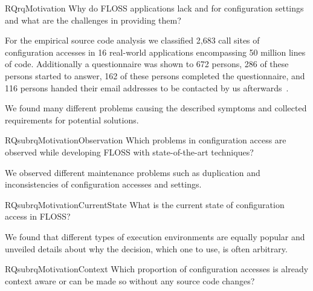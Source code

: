 \begin{restatable}{RQ}{rqMotivation}
Why do FLOSS applications lack  and  for configuration settings and what are the challenges in providing them?
 \label{rq:motivation}
\end{restatable}

For the empirical source code analysis we classified 2,683 call sites of configuration accesses in 16 real-world applications encompassing 50 million lines of code.
Additionally a questionnaire was shown to 672 persons, 286 of these persons started to answer, 162 of these persons completed the questionnaire, and 116 persons handed their email addresses to be contacted by us afterwards~\cite{raab2017challenges}.

\begin{contribution}
We found many different problems causing the described symptoms and collected requirements for potential solutions.
\end{contribution}

\begin{restatable}{RQsub}{rqMotivationObservation}
Which problems in configuration access are observed while developing FLOSS with state-of-the-art techniques?%
\label{rq:motivation-observation}
\end{restatable}

\begin{contribution}
We observed different maintenance problems such as duplication and inconsistencies of configuration accesses and settings.
\end{contribution}

\begin{restatable}{RQsub}{rqMotivationCurrentState}
What is the current state of configuration access in FLOSS?%
\label{rq:motivation-current-state}
\end{restatable}

\begin{contribution}
We found that different types of execution environments are equally popular and unveiled details about why the decision, which one to use, is often arbitrary.
\end{contribution}

\begin{restatable}{RQsub}{rqMotivationContext}
Which proportion of configuration accesses is already context aware or can be made so without any source code changes?%
\label{rq:motivation-context}
\end{restatable}

